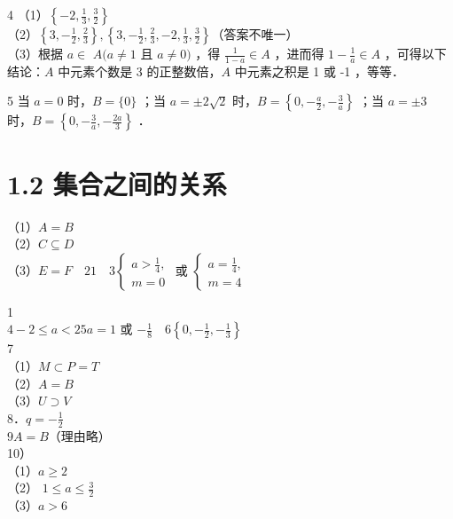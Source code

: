 \documentclass[10pt]{article}
\begin{document}
4 （1）\(\left\{-2, \frac{1}{3}, \frac{3}{2}\right\}\)\\
（2）\(\left\{3,-\frac{1}{2}, \frac{2}{3}\right\},\left\{3,-\frac{1}{2}, \frac{2}{3},-2, \frac{1}{3}, \frac{3}{2}\right\}\)（答案不唯一）\\
（3）根据 \(a \in\) \(A(a \neq 1\) 且 \(a \neq 0)\) ，得 \(\frac{1}{1-a} \in A\) ，进而得 \(1-\frac{1}{a} \in A\) ，可得以下结论：\(A\) 中元素个数是 3 的正整数倍，\(A\) 中元素之积是 1 或 -1 ，等等．

5 当 \(a=0\) 时，\(B=\{0\}\) ；当 \(a= \pm 2 \sqrt{2}\) 时，\(B=\left\{0,-\frac{a}{2},-\frac{3}{a}\right\}\) ；当 \(a= \pm 3\) 时，\(B=\left\{0,-\frac{3}{a},-\frac{2 a}{3}\right\}\) ．

\section*{1.2 集合之间的关系}
（1）\(A=B\)\\
（2）\(C \subseteq D\)\\
（3）\(E=F \quad 21 \quad 3\left\{\begin{array}{l}a>\frac{1}{4}, \\ m=0\end{array}\right.\) 或 \(\left\{\begin{array}{l}a=\frac{1}{4}, \\ m=4\end{array}\right.\)

1\\
\(4-2 \leqslant a<25 a=1\) 或 \(-\frac{1}{8} \quad 6\left\{0,-\frac{1}{2},-\frac{1}{3}\right\}\)\\
7\\
（1）\(M \subset P=T\)\\
（2）\(A=B\)\\
（3）\(U \supset V\)\\
8．\(q=-\frac{1}{2}\)\\
\(9 A=B\)（理由略）\\
10）\\
（1）\(a \geqslant 2\)\\
（2） \(1 \leqslant a \leqslant \frac{3}{2}\)\\
（3）\(a>6\)
\end{document}
